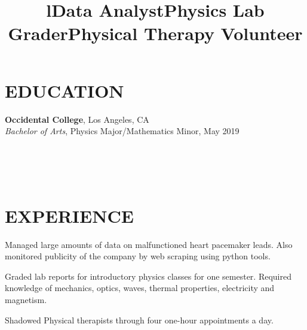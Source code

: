 \documentclass[margin]{res}
\begin{document}
\begin{resume}

\section{EDUCATION}
\textbf{Occidental College}, Los Angeles, CA\\
{\sl Bachelor of Arts}, Physics Major/Mathematics Minor, May 2019\hfill 


\begin{format}
\title{l}\\
\\
\body\\
\end{format}

\section{EXPERIENCE}
\title{\textbf{Data Analyst}}
\begin{position}
	Managed large amounts of data on malfunctioned heart pacemaker leads. Also monitored publicity of the company by web scraping using python tools.
\end{position}

\title{\textbf{Physics Lab Grader}}
\begin{position}
	Graded lab reports for introductory physics classes for one semester. Required knowledge of mechanics, optics, waves, thermal properties, electricity and magnetism.
\end{position}

\title{\textbf{Physical Therapy Volunteer}}
\begin{position}
	Shadowed Physical therapists through four one-hour appointments a day.
\end{position}


\end{resume}
\end{document}
